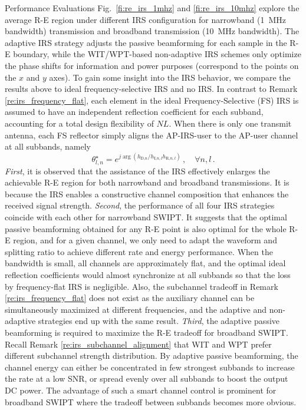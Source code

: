 \documentclass[journal]{IEEEtran}
\begin{document}
\begin{section}{Performance Evaluations}
		Fig.~\ref{fi:re_irs_1mhz} and \ref{fi:re_irs_10mhz} explore the average R-E region under different IRS configuration for narrowband (\SI{1}{\MHz} bandwidth) transmission and broadband transmission (\SI{10}{\MHz} bandwidth). The adaptive IRS strategy adjusts the passive beamforming for each sample in the R-E boundary, while the WIT/WPT-based non-adaptive IRS schemes only optimize the phase shifts for information and power purposes (correspond to the points on the $x$ and $y$ axes). To gain some insight into the IRS behavior, we compare the results above to ideal frequency-selective IRS and no IRS. In contrast to Remark \ref{re:irs_frequency_flat}, each element in the ideal Frequency-Selective (FS) IRS is assumed to have an independent reflection coefficient for each subband, accounting for a total design flexibility of $NL$. When there is only one transmit antenna, each FS reflector simply aligns the AP-IRS-user to the AP-user channel at all subbands, namely
		\begin{equation}
			\theta_{l,n}^{\star}=e^{j\arg{\left(h_{\text{D,}n}/h_{\text{I,}n,l}h_{\text{R,}n,l}\right)}}\,,\quad \forall n,l\,.
		\end{equation}
		\textit{First}, it is observed that the assistance of the IRS effectively enlarges the achievable R-E region for both narrowband and broadband transmissions. It is because the IRS enables a constructive channel composition that enhances the received signal strength. \textit{Second}, the performance of all four IRS strategies coincide with each other for narrowband SWIPT. It suggests that the optimal passive beamforming obtained for any R-E point is also optimal for the whole R-E region, and for a given channel, we only need to adapt the waveform and splitting ratio to achieve different rate and energy performance. When the bandwidth is small, all channels are approximately flat, and the optimal ideal reflection coefficients would almost synchronize at all subbands so that the loss by frequency-flat IRS is negligible. Also, the subchannel tradeoff in Remark \ref{re:irs_frequency_flat} does not exist as the auxiliary channel can be simultaneously maximized at different frequencies, and the adaptive and non-adaptive strategies end up with the same result. \textit{Third}, the adaptive passive beamforming is required to maximize the R-E tradeoff for broadband SWIPT. Recall Remark \ref{re:irs_subchannel_alignment} that WIT and WPT prefer different subchannel strength distribution. By adaptive passive beamforming, the channel energy can either be concentrated in few strongest subbands to increase the rate at a low SNR, or spread evenly over all subbands to boost the output DC power. The advantage of such a smart channel control is prominent for broadband SWIPT where the tradeoff between subbands becomes more obvious.
	\end{section}
\end{document}
